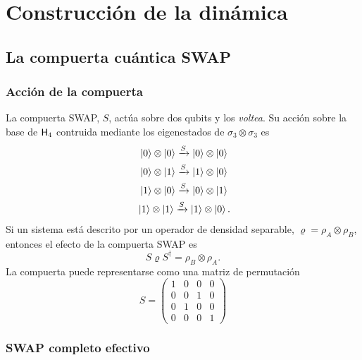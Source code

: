 \section{Construcción de la dinámica}
\subsection{La compuerta cuántica SWAP}

\subsubsection{Acción de la compuerta}
La compuerta SWAP, $S$, actúa sobre dos qubits y los \textit{voltea}. Su acción sobre la base de ${\sf H}_{4}$ contruida mediante los eigenestados de $\sigma_{3}\otimes\sigma_{3}$ es
\begin{align*}
    \ket{0}\otimes\ket{0}\xrightarrow{S}\ket{0}\otimes\ket{0}\\
    \ket{0}\otimes\ket{1}\xrightarrow{S}\ket{1}\otimes\ket{0}\\
    \ket{1}\otimes\ket{0}\xrightarrow{S}\ket{0}\otimes\ket{1}\\
    \ket{1}\otimes\ket{1}\xrightarrow{S}\ket{1}\otimes\ket{0} \rlap{.}
\end{align*}
Si un sistema está descrito por un operador de densidad separable, $\varrho=\rho_{A}\otimes\rho_{B}$, entonces el efecto de la compuerta SWAP es 
\begin{equation*}
    S\varrho S^{\dag}=\rho_{B}\otimes\rho_{A}.
\end{equation*}
La compuerta puede representarse como una matriz de permutación
\begin{equation*}
    S=\begin{pmatrix}
        1&0&0&0\\
        0&0&1&0\\
        0&1&0&0\\
        0&0&0&1
    \end{pmatrix}
\end{equation*}
\subsubsection{SWAP completo efectivo}

